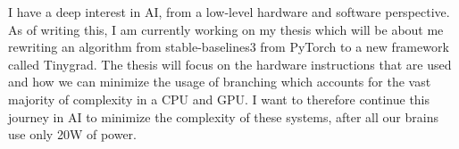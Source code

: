 \documentclass[../../main.tex]{subfiles}
\begin{document}
I have a deep interest in AI, from a low-level hardware and software perspective. As of writing this, I am currently working on my thesis which will be about me rewriting an algorithm from stable-baselines3 from PyTorch to a new framework called Tinygrad. The thesis will focus on the hardware instructions that are used and how we can minimize the usage of branching which accounts for the vast majority of complexity in a CPU and GPU. I want to therefore continue this journey in AI to minimize the complexity of these systems, after all our brains use only 20W of power.

\\
\end{document}
